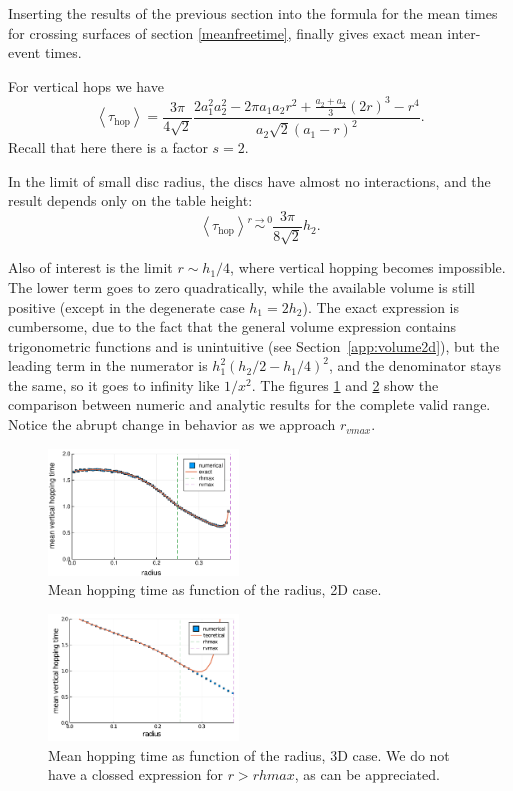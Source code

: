 \documentclass[superscriptaddress,pre,reprint,showpacs,twocolumn]{revtex4-1}
\newcommand{\mean}[1]{\left \langle #1 \right \rangle}
\begin{document}
 
Inserting the results of the previous section 
into the formula for the mean times for crossing
surfaces of section \eqref{meanfreetime}, finally gives exact mean inter-event times.

For vertical
hops we have
\begin{equation}\label{hoptau}
 \mean{\tau_\text{hop}} = 	
\frac{3 \pi}{4\sqrt{2}}
\frac{2 a_1^{2} a_2^{2}  - 2 \pi a_1 a_2 r^{2} + \textstyle \frac{a_2+a_2}{3}  (2r)^{3}  -  r^4}
{ a_2 \sqrt{2}  ( a_1 - r )^2}.
\end{equation}
Recall that here there is a factor $s = 2$.

In the limit of small disc radius, the discs have almost no interactions, and the result depends only
on the table height:
\begin{equation}\label{hoptaulimit}
 \mean{\tau_\text{hop}} \overset{r \to 0}{\sim}
\frac{3 \pi}{8\sqrt{2}}h_2.
\end{equation}

Also of interest is the limit $r\sim h_1/4$, where vertical hopping becomes
impossible.  The lower term goes to zero quadratically, while the available volume
is still positive (except in the degenerate case $h_1=2h_2$). The exact expression
is cumbersome, due to the fact that the general volume expression contains trigonometric functions
 and is unintuitive (see Section~\ref{app:volume2d}),
but the leading term in the numerator is  $h_1^2(h_2/2-h_1/4)^2$, and the denominator
stays the same, so
it goes to infinity
like $1/x^2$. The figures \ref{meanhopp2d} and
\ref{meanhopp3d} show the comparison between
numeric and analytic results for the complete valid range. Notice the abrupt
change in behavior as we approach $r_{vmax}$.

\begin{figure}[h]
  \centering
  \includegraphics[width=0.45\textwidth]{./figures/verthop2d.pdf}
  \caption{Mean hopping time as function of the radius, 2D case.}\label{meanhopp2d}
\end{figure}

\begin{figure}[h]
  \centering
  \includegraphics[width=0.45\textwidth]{./figures/verthop3d.pdf}
  \caption{Mean hopping time as function of the radius, 3D case.
    We do not have a clossed expression for $r>rhmax$, as can be appreciated.}
  \label{meanhopp3d}
\end{figure}
\end{document}

